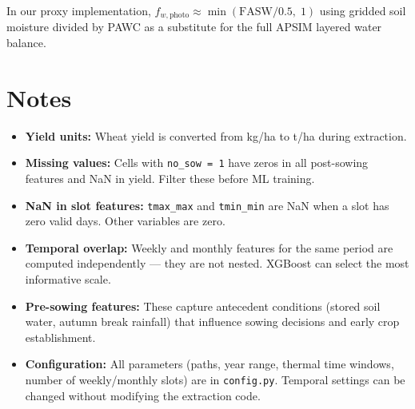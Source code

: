 \documentclass[11pt,a4paper]{article}
\begin{document}
\noindent In our proxy implementation, $f_{w,\text{photo}} \approx \min(\text{FASW}/0.5,\; 1)$ using gridded soil moisture divided by PAWC as a substitute for the full APSIM layered water balance.

\section{Notes}

\begin{itemize}
    \item \textbf{Yield units:} Wheat yield is converted from kg/ha to t/ha during extraction.
    \item \textbf{Missing values:} Cells with \texttt{no\_sow = 1} have zeros in all post-sowing features and NaN in yield. Filter these before ML training.
    \item \textbf{NaN in slot features:} \texttt{tmax\_max} and \texttt{tmin\_min} are NaN when a slot has zero valid days. Other variables are zero.
    \item \textbf{Temporal overlap:} Weekly and monthly features for the same period are computed independently --- they are not nested. XGBoost can select the most informative scale.
    \item \textbf{Pre-sowing features:} These capture antecedent conditions (stored soil water, autumn break rainfall) that influence sowing decisions and early crop establishment.
    \item \textbf{Configuration:} All parameters (paths, year range, thermal time windows, number of weekly/monthly slots) are in \texttt{config.py}. Temporal settings can be changed without modifying the extraction code.
\end{itemize}
\end{document}
